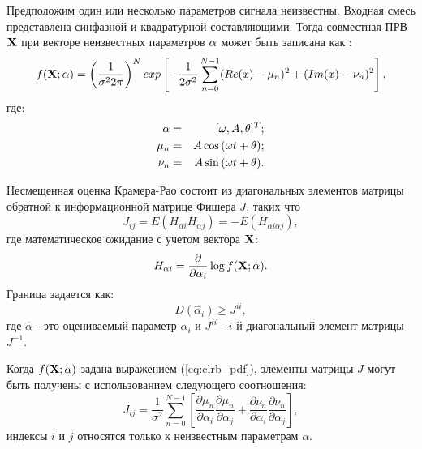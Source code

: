Предположим один или несколько параметров сигнала неизвестны. Входная смесь представлена синфазной и квадратурной составляющими. Тогда совместная ПРВ ${\bf{X}}$
при векторе неизвестных параметров ${\bf{\alpha}}$  может быть записана как \cite{rife-crlb-article}:
\begin{equation}
	\label{eq:clrb_pdf}
	f({\bf{X}}; {\bf{\alpha}}) = \left( \frac{1}{\sigma^2 2 \pi} \right)^N exp \left[ -\frac{1}{2\sigma^2} \sum_{n=0}^{N-1} (Re(x)-\mu_n)^2 + (Im(x) - \nu_n)^2 \right],
\end{equation}
где:
\begin{eqnarray}
	\label{eq:clrb_alpha}
	{\bf{\alpha}} & = & [\omega, A, \theta]^T; \\
	\mu_n & = & A \cos{(\omega t + \theta)}; \\
	\nu_n & = & A \sin{(\omega t + \theta)}.
\end{eqnarray}

Несмещенная оценка Крамера-Рао состоит из диагональных элементов матрицы обратной к информационной матрице Фишера ${J}$, таких что
\begin{equation}
	\label{eq:crlb_Jij}
	J_{ij} = E(H_{\alpha i} H_{\alpha j}) = -E(H_{\alpha i \alpha j}),
\end{equation}
где математическое ожидание с учетом вектора ${\bf{X}}$:
\begin{equation}
	\label{eq:crlb_H}
	H_{\alpha i} = \frac{\partial}{\partial \alpha_i} \log{f({\bf{X}}; {\bf{\alpha}})}.
\end{equation}
Граница задается как:
\begin{equation}
	\label{eq:crlb_var_alpha}
	D(\hat{\alpha}_i) \ge J^{ii},
\end{equation}
где ${\hat{\alpha}}$ - это оцениваемый параметр ${\alpha_i}$ и ${J^{ii}}$ - ${i}$-й диагональный элемент матрицы ${J^{-1}}$.

Когда ${f({\bf{X}}; {\bf{\alpha}})}$ задана выражением (\ref{eq:clrb_pdf}), элементы матрицы ${J}$ могут быть получены с использованием следующего соотношения:
\begin{equation}
	\label{eq:crlb_Jij_full}
	J_{ij} = \frac{1}{\sigma^2} \sum_{n=0}^{N-1} \left[ \frac{\partial \mu_n}{\partial \alpha_i} \frac{\partial \mu_n}{\partial \alpha_j} + \frac{\partial \nu_n}{\partial \alpha_i} \frac{\partial \nu_n}{\partial \alpha_j} \right],
\end{equation}
индексы ${i}$ и ${j}$ относятся только к неизвестным параметрам ${\alpha}$.

